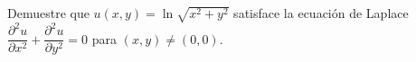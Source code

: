 Demuestre que $u(x, y) = \ln\!\sqrt{x^2 + y^2}$ satisface la ecuación de Laplace $\dfrac{\partial^2 u}{\partial x^2} + \dfrac{\partial^2 u}{\partial y^2} = 0$ para $(x, y) \neq (0, 0)$.
